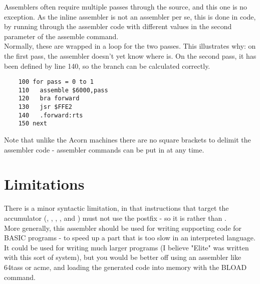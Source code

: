 Assemblers often require multiple passes through the source, and this one is no exception. As the inline assembler is not an assembler per se, this is done in code, by running through the assembler code with different values in the second parameter of the assemble command. \\

Normally, these are wrapped in a loop for the two passes. This illustrates why: on the first pass, the assembler doesn’t yet know where  is. On the second pass, it has been defined by line 140, so the branch can be calculated correctly.

\begin{verbatim}
	100 for pass = 0 to 1
	110   assemble $6000,pass
	120   bra forward
	130   jsr $FFE2
	140   .forward:rts
	150 next
\end{verbatim}

Note that unlike the Acorn machines there are no square brackets to delimit the assembler code - assembler commands can be put in at any time.

\section {Limitations}

There is a minor syntactic limitation, in that instructions that target the accumulator (, , , ,  and ) must not use the  postfix - so it is  rather than .\\

More generally, this assembler should be used for writing supporting code for BASIC programs - to speed up a part that is too slow in an interpreted language. It could be used for writing much larger programs (I believe "Elite" was written with this sort of system), but you would be better off using an assembler like 64tass or acme, and loading the generated code into memory with the BLOAD command.


